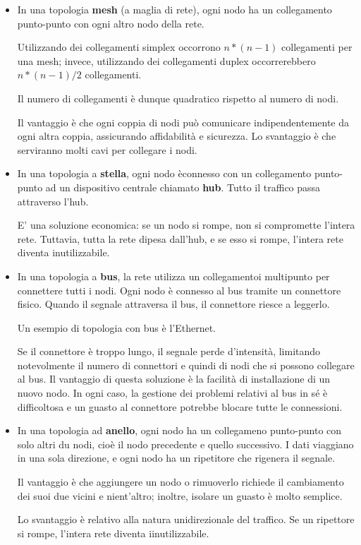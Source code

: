 \begin{itemize}
    \item 
    In una topologia \textbf{mesh} (a maglia di rete), ogni nodo ha un collegamento punto-punto con ogni altro nodo della rete. 
    
    Utilizzando dei collegamenti simplex occorrono \(n*(n-1)\) collegamenti per una mesh; invece, utilizzando dei collegamenti duplex occorrerebbero \(n*(n-1)/2\) collegamenti.
    
    Il numero di collegamenti è dunque quadratico rispetto al numero di nodi.
    
    Il vantaggio è che ogni coppia di nodi può comunicare indipendentemente da ogni altra coppia, assicurando affidabilità e sicurezza. Lo svantaggio è che serviranno molti cavi per collegare i nodi.
    
    \item
    In una topologia a \textbf{stella}, ogni nodo èconnesso con un collegamento punto-punto ad un dispositivo centrale chiamato \textbf{hub}. Tutto il traffico passa attraverso l'hub.
    
    E' una soluzione economica: se un nodo si rompe, non si compromette l'intera rete. Tuttavia, tutta la rete dipesa dall'hub, e se esso si rompe, l'intera rete diventa inutilizzabile.
    
    \item
    In una topologia a \textbf{bus}, la rete utilizza un collegamentoi multipunto per connettere tutti i nodi. Ogni nodo è connesso al bus tramite un connettore fisico. Quando il segnale attraversa il bus, il connettore riesce a leggerlo.
    
    Un esempio di topologia con bus è l'Ethernet.
    
    Se il connettore è troppo lungo, il segnale perde d'intensità, limitando notevolmente il numero di connettori e quindi di nodi che si possono collegare al bus. Il vantaggio di questa soluzione è la facilità di installazione di un nuovo nodo. In ogni caso, la gestione dei problemi relativi al bus in sé è difficoltosa e un guasto al connettore potrebbe blocare tutte le connessioni.
    
    \item
    In una topologia ad \textbf{anello}, ogni nodo ha un collegameno punto-punto con solo altri du nodi, cioè il nodo precedente e quello successivo. I dati viaggiano in una sola direzione, e ogni nodo ha un ripetitore che rigenera il segnale.
    
    Il vantaggio è che aggiungere un nodo o rimuoverlo richiede il cambiamento dei suoi due vicini e nient'altro; inoltre, isolare un guasto è molto semplice.
    
    Lo svantaggio è relativo alla natura unidirezionale del traffico. Se un ripettore si rompe, l'intera rete diventa iinutilizzabile.
\end{itemize}

